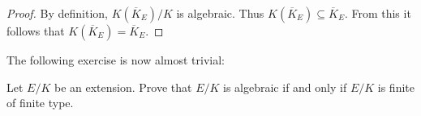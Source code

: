\begin{proof}
    By definition, $K(\overline{K}_E)/K$ is algebraic. 
    Thus $K(\overline{K}_E)\subseteq\overline{K}_E$. From this it follows that
    $K(\overline{K}_E)=\overline{K}_E$. 
\end{proof}

The following exercise is now almost trivial:

\begin{exercise}
    Let $E/K$ be an extension. Prove that $E/K$ is algebraic if and only if $E/K$ 
    is finite of finite type. 
\end{exercise}


